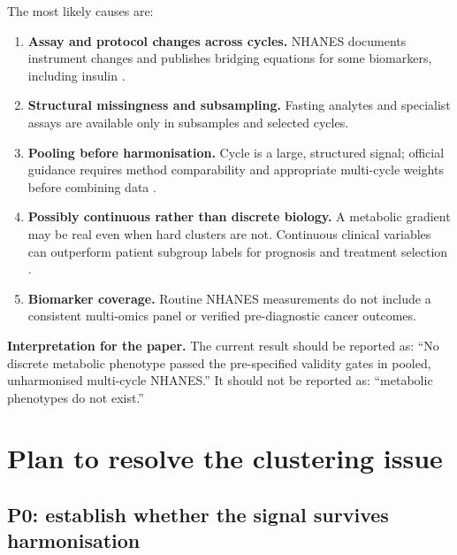 \documentclass[11pt,a4paper]{article}
\begin{document}
The most likely causes are:

\begin{enumerate}
  \item \textbf{Assay and protocol changes across cycles.} NHANES documents
  instrument changes and publishes bridging equations for some biomarkers,
  including insulin \citep{nhanesInsulin}.
  \item \textbf{Structural missingness and subsampling.} Fasting analytes and
  specialist assays are available only in subsamples and selected cycles.
  \item \textbf{Pooling before harmonisation.} Cycle is a large, structured signal;
  official guidance requires method comparability and appropriate multi-cycle
  weights before combining data \citep{nhanesWeights,nhanesQuality}.
  \item \textbf{Possibly continuous rather than discrete biology.} A metabolic
  gradient may be real even when hard clusters are not. Continuous clinical
  variables can outperform patient subgroup labels for prognosis and treatment
  selection \citep{dennis2019}.
  \item \textbf{Biomarker coverage.} Routine NHANES measurements do not include a
  consistent multi-omics panel or verified pre-diagnostic cancer outcomes.
\end{enumerate}

\begin{decisionbox}
\textbf{Interpretation for the paper.}
The current result should be reported as: ``No discrete metabolic phenotype
passed the pre-specified validity gates in pooled, unharmonised multi-cycle
NHANES.'' It should not be reported as: ``metabolic phenotypes do not exist.''
\end{decisionbox}

\section{Plan to resolve the clustering issue}

\subsection{P0: establish whether the signal survives harmonisation}
\end{document}
